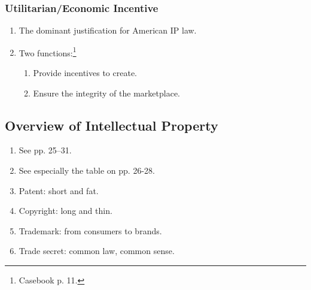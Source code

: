 \subsubsection{Utilitarian/Economic Incentive}

\begin{enumerate}
    \item The dominant justification for American IP law.
    \item Two functions:\footnote{Casebook p. 11.}
    \begin{enumerate}
        \item Provide incentives to create.
        \item Ensure the integrity of the marketplace.
    \end{enumerate}
\end{enumerate}

\subsection{Overview of Intellectual Property}

\begin{enumerate}
    \item See pp. 25--31.
    \item See especially the table on pp. 26-28.
    \item Patent: short and fat.
    \item Copyright: long and thin.
    \item Trademark: from consumers to brands.
    \item Trade secret: common law, common sense.
\end{enumerate}

